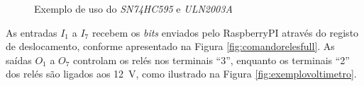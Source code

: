 \begin{figure}[hbtp]
	\centering%
		\centering
		\qquad
		\caption{Exemplo de uso do \textit{SN74HC595} e \textit{ULN2003A}}%
		\label{fig:ligacao5952003}%
	\end{figure}

As entradas $I_{1}$ a $I_{7}$ recebem os \textit{bits} enviados pelo \gls{RaspberryPI} através do registo de deslocamento, conforme apresentado na Figura \ref{fig:comandorelesfull}. As saídas $O_{1}$ a $O_{7}$ controlam os relés nos terminais ``3'', enquanto os terminais ``2'' dos relés são ligados aos \SI{12}{\volt}, como ilustrado na Figura \ref{fig:exemplovoltimetro}.



